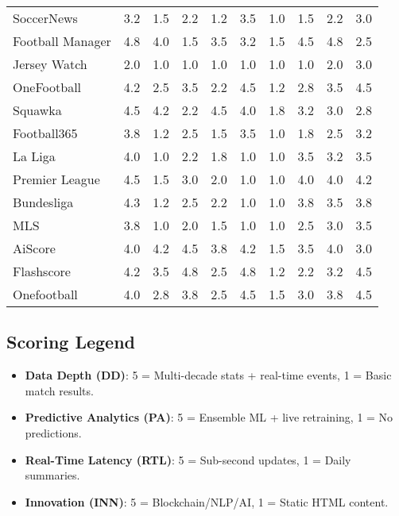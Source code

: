 \begin{table}[h!]
\begin{tabular}{|l|c|c|c|c|c|c|c|c|c|}
        SoccerNews & 3.2 & 1.5 & 2.2 & 1.2 & 3.5 & 1.0 & 1.5 & 2.2 & 3.0 \\
        Football Manager & 4.8 & 4.0 & 1.5 & 3.5 & 3.2 & 1.5 & 4.5 & 4.8 & 2.5 \\
        Jersey Watch & 2.0 & 1.0 & 1.0 & 1.0 & 1.0 & 1.0 & 1.0 & 2.0 & 3.0 \\
        OneFootball & 4.2 & 2.5 & 3.5 & 2.2 & 4.5 & 1.2 & 2.8 & 3.5 & 4.5 \\
        Squawka & 4.5 & 4.2 & 2.2 & 4.5 & 4.0 & 1.8 & 3.2 & 3.0 & 2.8 \\
        Football365 & 3.8 & 1.2 & 2.5 & 1.5 & 3.5 & 1.0 & 1.8 & 2.5 & 3.2 \\
        La Liga & 4.0 & 1.0 & 2.2 & 1.8 & 1.0 & 1.0 & 3.5 & 3.2 & 3.5 \\
        Premier League & 4.5 & 1.5 & 3.0 & 2.0 & 1.0 & 1.0 & 4.0 & 4.0 & 4.2 \\
        Bundesliga & 4.3 & 1.2 & 2.5 & 2.2 & 1.0 & 1.0 & 3.8 & 3.5 & 3.8 \\
        MLS & 3.8 & 1.0 & 2.0 & 1.5 & 1.0 & 1.0 & 2.5 & 3.0 & 3.5 \\
        AiScore & 4.0 & 4.2 & 4.5 & 3.8 & 4.2 & 1.5 & 3.5 & 4.0 & 3.0 \\
        Flashscore & 4.2 & 3.5 & 4.8 & 2.5 & 4.8 & 1.2 & 2.2 & 3.2 & 4.5 \\
        Onefootball & 4.0 & 2.8 & 3.8 & 2.5 & 4.5 & 1.5 & 3.0 & 3.8 & 4.5 \\
        \hline
    \end{tabular}
\end{table}

\subsection{Scoring Legend}
\begin{itemize}
    \item \textbf{Data Depth (DD)}: 5 = Multi-decade stats + real-time events, 1 = Basic match results.
    \item \textbf{Predictive Analytics (PA)}: 5 = Ensemble ML + live retraining, 1 = No predictions.
    \item \textbf{Real-Time Latency (RTL)}: 5 = Sub-second updates, 1 = Daily summaries.
    \item \textbf{Innovation (INN)}: 5 = Blockchain/NLP/AI, 1 = Static HTML content.
\end{itemize}

